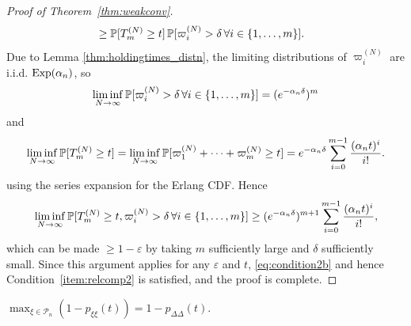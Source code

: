 \begin{proof}[Proof of Theorem~\ref{thm:weakconv}]
\begin{align*}
&\geq \mathbb{P}[ T_m^{(N)} \geq t ]
        \,\mathbb{P}[ \varpi_i^{(N)} > \delta \,\forall i\in \{1,\dots,m\} ] .
\end{align*}
Due to Lemma \ref{thm:holdingtimes_distn}, the limiting distributions of $\varpi_i^{(N)}$ are i.i.d. $\operatorname{Exp}(\alpha_n)$, so
\begin{equation*}
\liminf_{N\to\infty} \mathbb{P}[ \varpi_i^{(N)} > \delta \,\forall i\in \{1,\dots,m\} ]
= (e^{-\alpha_n \delta})^m
\end{equation*}
and
\begin{equation*}
\liminf_{N\to\infty} \mathbb{P}[ T_m^{(N)} \geq t ]
= \liminf_{N\to\infty} \mathbb{P}[ \varpi_1^{(N)} + \cdots + \varpi_m^{(N)} \geq t ]
= e^{-\alpha_n \delta} \sum_{i=0}^{m-1} \frac{(\alpha_n t)^i}{i!} .
\end{equation*}
using the series expansion for the Erlang CDF. 
Hence 
\begin{equation*}
\liminf_{N\to\infty} 
        \mathbb{P}[ T_m^{(N)} \geq t, \varpi_i^{(N)} > \delta \,\forall i\in \{1,\dots,m\} ]
\geq (e^{-\alpha_n \delta})^{m+1} \sum_{i=0}^{m-1} \frac{(\alpha_n t)^i}{i!} ,
\end{equation*}
which can be made $\geq 1-\varepsilon$ by taking $m$ sufficiently large and $\delta$ sufficiently small.
Since this argument applies for any $\varepsilon$ and $t$, \eqref{eq:condition2b} and hence Condition~\ref{item:relcomp2} is satisfied, and the proof is complete.
\end{proof}




\begin{lemma}\label{thm:maximum_pr}
$\max_{\xi\in \mathcal{P}_n} (1 - p_{\xi\xi}(t)) = 1 - p_{\Delta\Delta}(t)$.
\end{lemma}

